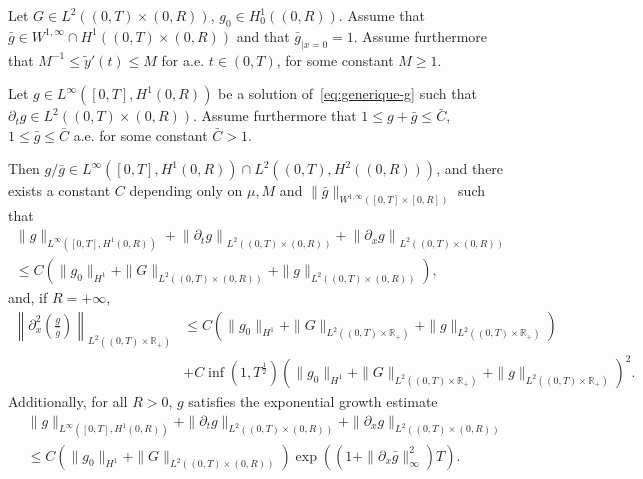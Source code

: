 \documentclass[AHL,Unicode,longabstracts,published]{cedram}
\newcommand{\R}{\mathbb{R}}
\newcommand{\p}{\partial}
\newcommand{\ty}{\widetilde{y}}
\begin{document}
\begin{lemm}\label{lem:generique-g}
Let $G\in L^2((0,T)\times (0,R))$, $g_0\in H^1_0((0,R))$. Assume that $\bar g \in W^{1,\infty}\cap H^1((0,T)\times (0,R))$ and that $\bar g_{|x=0}=1$. Assume furthermore that $M^{-1}\leq \ty'(t)\leq M$ for a.e. $t\in (0,T)$, for some constant $M\geq 1$.

Let $g\in L^\infty([0,T], H^1(0,R))$ be a solution of~\eqref{eq:generique-g} such that $\p_t g\in L^2((0,T)\times (0,R))$. Assume furthermore that $1\leq g + \bar g \leq \bar C$, $1\leq \bar g \leq \bar C$ a.e. for some constant $\bar C>1$.

Then $g/\bar g\in L^\infty([0,T], H^1(0,R))\cap L^2((0,T), H^2((0,R)))$, and there exists a constant $C$ depending only on $\mu, M$ and $\|\bar g\|_{W^{1,\infty}([0,T]\times [0,R])}$ such that
\begin{multline*}
\|g\|_{L^\infty\left([0,T], H^1(0,R)\right)} + \left\| \p_t g\right\|_{ L^2\left((0,T)\times (0,R)\right)} + \left\|\p_x g \right\|_{ L^2\left((0,T)\times (0,R)\right)} \\
\leq C \left(\|g_0\|_{H^1} + \| G\|_{L^2\left((0,T)\times (0,R)\right)} +\|g\|_{L^2\left((0,T)\times (0,R)\right)}\right),
\end{multline*}
and, if $R=+\infty$,
\begin{align*}
\left\| \p_x^2 \left(\frac{g}{\bar g}\right)\right\|_{L^2\left((0,T)\times \R_+\right)}
&\leq C \left(\|g_0\|_{H^1} + \| G\|_{L^2\left((0,T)\times \R_+\right)} +\|g\|_{L^2\left((0,T)\times \R_+\right)}\right)\\
&+ C \inf\left(1, T^{\frac{1}{2}}\right)\left(\|g_0\|_{H^1} + \| G\|_{L^2\left((0,T)\times \R_+\right)} +\|g\|_{L^2\left((0,T)\times \R_+\right)}\right)^2.
\end{align*}
Additionally, for all $R>0$, $g$ satisfies the exponential growth estimate
\begin{align*}
&\|g\|_{L^\infty([0,T], H^1(0,R))} + \| \p_t g\|_{ L^2((0,T)\times (0,R))} + \|\p_x g \|_{ L^2((0,T)\times (0,R))}\\
&\leq C \left(\|g_0\|_{H^1} + \| G\|_{L^2((0,T)\times (0,R))}\right) \exp((1+ \|\p_x \bar g\|_\infty^2) T).
\end{align*}
\end{lemm}
\end{document}
